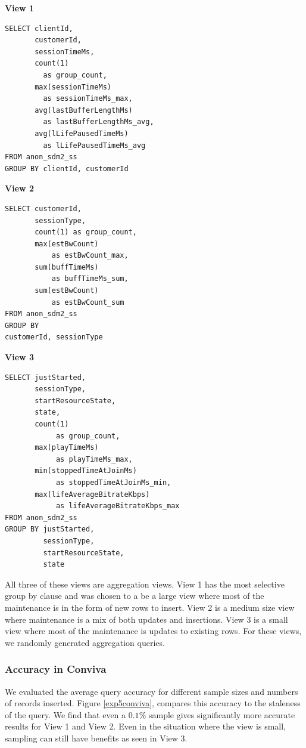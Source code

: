 \textbf{View 1}
\begin{lstlisting}
SELECT clientId, 
       customerId, 
       sessionTimeMs, 
       count(1) 
         as group_count, 
       max(sessionTimeMs) 
         as sessionTimeMs_max, 
       avg(lastBufferLengthMs) 
         as lastBufferLengthMs_avg,
       avg(lLifePausedTimeMs) 
         as lLifePausedTimeMs_avg 
FROM anon_sdm2_ss 
GROUP BY clientId, customerId
\end{lstlisting}

\vspace{1em}

\textbf{View 2}
\begin{lstlisting}
SELECT customerId, 
       sessionType, 
       count(1) as group_count, 
       max(estBwCount) 
           as estBwCount_max, 
       sum(buffTimeMs) 
           as buffTimeMs_sum, 
       sum(estBwCount) 
           as estBwCount_sum 
FROM anon_sdm2_ss 
GROUP BY 
customerId, sessionType
\end{lstlisting}

\vspace{1em}

\textbf{View 3}
\begin{lstlisting}
SELECT justStarted, 
       sessionType, 
       startResourceState, 
       state, 
       count(1) 
            as group_count, 
       max(playTimeMs) 
            as playTimeMs_max, 
       min(stoppedTimeAtJoinMs) 
            as stoppedTimeAtJoinMs_min, 
       max(lifeAverageBitrateKbps) 
            as lifeAverageBitrateKbps_max 
FROM anon_sdm2_ss 
GROUP BY justStarted, 
         sessionType, 
         startResourceState, 
         state
\end{lstlisting}

All three of these views are aggregation views. 
View 1 has the most selective group by clause and was chosen to a be a large view where most of the maintenance is in the form of new rows to insert.
View 2 is a medium size view where maintenance is a mix of both updates and insertions.
View 3 is a small view where most of the maintenance is updates to existing rows.
For these views, we randomly generated aggregation queries.

\subsubsection{Accuracy in Conviva}
We evaluated the average query accuracy for different sample sizes and numbers of records inserted.
Figure \ref{exp5conviva}, compares this accuracy to the staleness of the query.
We find that even a $0.1\%$ sample gives significantly more accurate results for View 1 and View 2.
Even in the situation where the view is small, sampling can still have benefits as seen in View 3.


